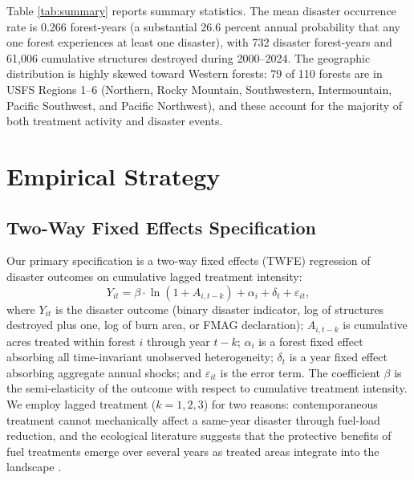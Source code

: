 \documentclass[12pt, letterpaper]{article}
\begin{document}


Table \ref{tab:summary} reports summary statistics. The mean disaster occurrence rate is 0.266 forest-years (a substantial 26.6 percent annual probability that any one forest experiences at least one disaster), with 732 disaster forest-years and 61{,}006 cumulative structures destroyed during 2000--2024. The geographic distribution is highly skewed toward Western forests: 79 of 110 forests are in USFS Regions 1--6 (Northern, Rocky Mountain, Southwestern, Intermountain, Pacific Southwest, and Pacific Northwest), and these account for the majority of both treatment activity and disaster events.

\section{Empirical Strategy}\label{sec:strategy}

\subsection{Two-Way Fixed Effects Specification}

Our primary specification is a two-way fixed effects (TWFE) regression of disaster outcomes on cumulative lagged treatment intensity:
\begin{equation}
Y_{it} = \beta \cdot \ln(1 + A_{i,t-k}) + \alpha_i + \delta_t + \varepsilon_{it},
\label{eq:twfe}
\end{equation}
where $Y_{it}$ is the disaster outcome (binary disaster indicator, log of structures destroyed plus one, log of burn area, or FMAG declaration); $A_{i,t-k}$ is cumulative acres treated within forest $i$ through year $t - k$; $\alpha_i$ is a forest fixed effect absorbing all time-invariant unobserved heterogeneity; $\delta_t$ is a year fixed effect absorbing aggregate annual shocks; and $\varepsilon_{it}$ is the error term. The coefficient $\beta$ is the semi-elasticity of the outcome with respect to cumulative treatment intensity. We employ lagged treatment ($k = 1, 2, 3$) for two reasons: contemporaneous treatment cannot mechanically affect a same-year disaster through fuel-load reduction, and the ecological literature suggests that the protective benefits of fuel treatments emerge over several years as treated areas integrate into the landscape \citep{stephens2012, agee2005}.
\end{document}
